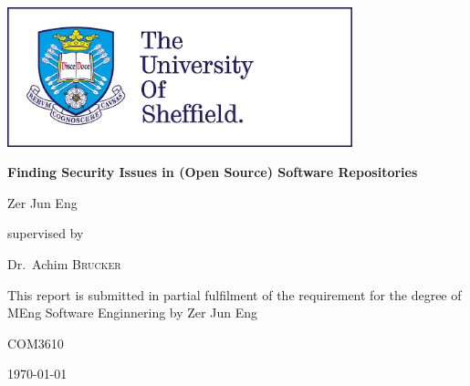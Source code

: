 \documentclass[12pt, a4paper]{report}
\begin{document}
\begin{titlepage}
	\centering
	\includegraphics[width=10cm]{tuos_logo}\par\vspace{1cm}
	\vspace{1cm}

	{\huge\bfseries Finding Security Issues in (Open Source) Software Repositories\par}
	\vspace{1cm}

	{\Large Zer Jun Eng\par}
	\vspace{1cm}

	supervised by\par
	Dr.~Achim \textsc{Brucker}
	\vfill

	{This report is submitted in partial fulfilment of the requirement for the degree of
		MEng Software Enginnering by Zer Jun Eng}
	\vfill

	{\large COM3610}
	\vfill

	{\large \today}
\end{titlepage}



\end{document}
